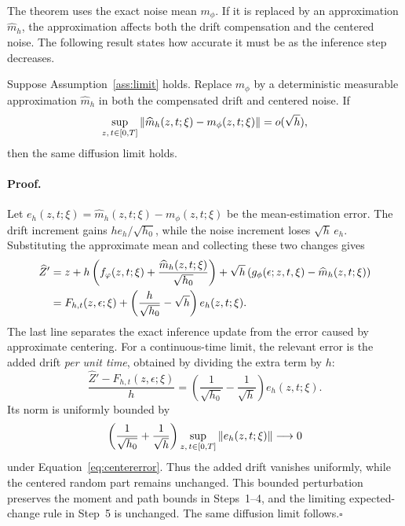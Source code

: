 The theorem uses the exact noise mean $m_\phi$. If it is replaced by an approximation $\widehat m_h$, the approximation affects both the drift compensation and the centered noise. The following result states how accurate it must be as the inference step decreases.

\begin{corollary}\label{cor:centering}
Suppose Assumption~\ref{ass:limit} holds. Replace $m_\phi$ by a deterministic measurable approximation $\widehat m_h$ in both the compensated drift and centered noise. If
\begin{equation}\label{eq:centererror}
 \sup_{z,\,t\in[0,T]}\left\lVert \widehat m_h(z,t;\xi)-m_\phi(z,t;\xi)\right\rVert=o(\sqrt h),
\end{equation}
then the same diffusion limit holds.
\end{corollary}
\paragraph{Proof.}
Let $e_h(z,t;\xi)=\widehat m_h(z,t;\xi)-m_\phi(z,t;\xi)$ be the mean-estimation error. The drift increment gains $h e_h/\sqrt{h_0}$, while the noise increment loses $\sqrt h\,e_h$. Substituting the approximate mean and collecting these two changes gives
\begin{align}\label{eq:approximateupdate}
 \widehat Z'
 &=z+h\left(f_\varphi(z,t;\xi)+\frac{\widehat m_h(z,t;\xi)}{\sqrt{h_0}}\right)+\sqrt h\left(g_\phi(\epsilon;z,t,\xi)-\widehat m_h(z,t;\xi)\right)\notag\\
 &=F_{h,t}(z,\epsilon;\xi)
   +\left(\frac h{\sqrt{h_0}}-\sqrt h\right)e_h(z,t;\xi).
\end{align}
The last line separates the exact inference update from the error caused by approximate centering. For a continuous-time limit, the relevant error is the added drift \emph{per unit time}, obtained by dividing the extra term by $h$:
\begin{equation}\label{eq:centering-drift-error}
 \frac{\widehat Z'-F_{h,t}(z,\epsilon;\xi)}h
 =\left(\frac1{\sqrt{h_0}}-\frac1{\sqrt h}\right)e_h(z,t;\xi).
\end{equation}
Its norm is uniformly bounded by
\[
 \left(\frac1{\sqrt{h_0}}+\frac1{\sqrt h}\right)
 \sup_{z,\,t\in[0,T]}\left\lVert e_h(z,t;\xi)\right\rVert\longrightarrow0
\]
under Equation~\eqref{eq:centererror}. Thus the added drift vanishes uniformly, while the centered random part remains unchanged. This bounded perturbation preserves the moment and path bounds in Steps~1--4, and the limiting expected-change rule in Step~5 is unchanged. The same diffusion limit follows.\hfill$\square$

